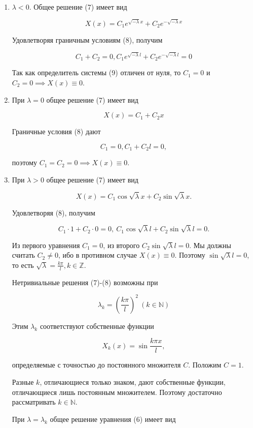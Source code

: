 \begin{enumerate}
	\item{
			$\lambda<0$. Общее решение (7) имеет вид

			\[
				X(x) = C_1 e^{\sqrt{-\lambda}x} + C_2 e^{-\sqrt{-\lambda}x}
			\]

			Удовлетворяя граничным условиям (8), получим

			\[
				C_1 + C_2 = 0, C_1 e^{\sqrt{-\lambda} l}+C_2 e^{-\sqrt{-\lambda}l}=0 \tag{9}
			\]

			Так как определитель системы (9) отличен от нуля, то $C_1=0$ и $C_2=0 \implies X(x)\equiv 0$. 
	}
	\item{
			При $\lambda=0$ общее решение (7) имеет вид

			\[
				X(x) = C_1 + C_2 x
			\]

			Граничные условия (8) дают

			\[
				C_1 = 0, C_1 + C_2 l = 0,
			\]

			поэтому $C_1=C_2=0 \implies X(x)\equiv0.$
	}
	\item{
			При $\lambda > 0$ общее решение (7) имеет вид

			\[
				X(x) = C_1 \cos \sqrt{\lambda} x + C_2 \sin \sqrt{\lambda} x.
			\]

			Удовлетворяя (8), получим

			\[
				C_1 \cdot 1 + C_2 \cdot 0 = 0, ~ C_1 \cos \sqrt{\lambda} l + C_2 \sin \sqrt{\lambda} l = 0.
			\]

			Из первого уравнения $C_1 = 0$, из второго $C_2 \sin \sqrt{\lambda} l = 0$. Мы должны считать $C_2 \ne 0$, ибо в противном случае $X(x) \equiv 0$. Поэтому $\sin \sqrt{\lambda} l = 0$, то есть $\sqrt{\lambda} = \frac{k \pi}{l}, k \in \mathbb{Z}$.

			Нетривиальные решения (7)-(8) возможны при

			\[
				\lambda_k = \left( \frac{k \pi}{l} \right)^2 ~ (k \in \mathbb{N})
			\]

			Этим $\lambda_k$ соответствуют собственные функции

			\[
				X_k (x) = \sin \frac{k \pi x}{l},
			\]

			определяемые с точностью до постоянного множителя $C$. Положим $C=1$.

			Разные $k$, отличающиеся только знаком, дают собственные функции, отличающиеся лишь постоянным множителем. Поэтому достаточно рассматривать $k \in \mathbb{N}$.

			При $\lambda = \lambda_k$ общее решение уравнения (6) имеет вид

}
\end{enumerate}
